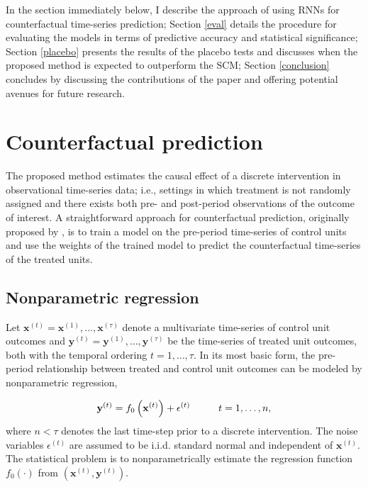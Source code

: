 \documentclass[hidelinks,12pt]{article}
\begin{document}
In the section immediately below, I describe the approach of using RNNs for counterfactual time-series prediction; Section \ref{eval} details the procedure for evaluating the models in terms of predictive accuracy and statistical significance; Section \ref{placebo} presents the results of the placebo tests and discusses when the proposed method is expected to outperform the SCM; Section \ref{conclusion} concludes by discussing the contributions of the paper and offering potential avenues for future research. 

\section{Counterfactual prediction} \label{prediction}

The proposed method estimates the causal effect of a discrete intervention in observational time-series data; i.e., settings in which treatment is not randomly assigned and there exists both pre- and post-period observations of the outcome of interest. A straightforward approach for counterfactual prediction, originally proposed by \citet{brodersen2015inferring}, is to train a model on the pre-period time-series of control units and use the weights of the trained model to predict the counterfactual time-series of the treated units. 

\subsection{Nonparametric regression}

Let $\mathbf{x}^{(t)}= \mathbf{x}^{(1)}, \ldots, \mathbf{x}^{(\tau)}$ denote a multivariate time-series of control unit outcomes and  $\mathbf{y}^{(t)}= \mathbf{y}^{(1)}, \ldots, \mathbf{y}^{(\tau)}$ be the time-series of treated unit outcomes, both with the temporal ordering $t = 1, \ldots, \tau$. In its most basic form, the pre-period relationship between treated and control unit outcomes can be modeled by nonparametric regression, 

\begin{equation}\label{eq:pre}
  \mathbf{y}^{(t)} =  f_0 \left(\mathbf{x}^{(t)}\right) + \epsilon^{(t)} \hspace{10mm} t = 1, \ldots, n, 
\end{equation}
\noindent
where $n < \tau$ denotes the last time-step prior to a discrete intervention. The noise variables $\epsilon^{(t)}$ are assumed to be i.i.d. standard normal and independent of $\mathbf{x}^{(t)}$. The statistical problem is to nonparametrically estimate the regression function $f_0(\cdot)$ from $\left(\mathbf{x}^{(t)}, \mathbf{y}^{(t)}\right)$. 
\end{document}

